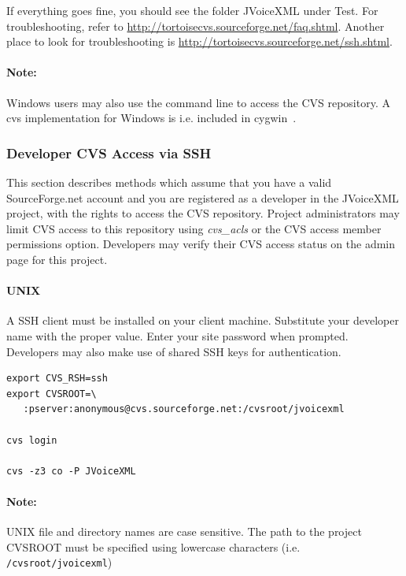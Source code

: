 \documentclass[11pt,a4paper]{article}
\begin{document}
If everything goes fine, you should see the folder JVoiceXML under Test. 
For troubleshooting, refer to 
\url{http://tortoisecvs.sourceforge.net/faq.shtml}. 
Another place to look for  troubleshooting is 
\url{http://tortoisecvs.sourceforge.net/ssh.shtml}.

\paragraph{Note:}
Windows users may also use the command line to access the CVS repository. 
A cvs implementation for Windows is i.e. included in cygwin~\cite{cygwin}.

\subsubsection{Developer CVS Access via SSH}
\label{sec:developer-cvs-access}

This section describes methods which assume that you have a valid 
SourceForge.net account and you 
are registered as a developer in the JVoiceXML project, with the rights
to access the CVS repository.
Project administrators may limit CVS access to this repository using 
\emph{cvs\_acls} or the CVS access member permissions option. 
Developers may verify their CVS access status on the admin page for this 
project.

\paragraph{UNIX}

A SSH client 
must be installed on your client machine. Substitute your
developer name with the proper value. Enter your site password when prompted.
Developers may also make use of shared SSH keys for authentication.

\begin{lstlisting}
export CVS_RSH=ssh
export CVSROOT=\
   :pserver:anonymous@cvs.sourceforge.net:/cvsroot/jvoicexml

cvs login
 
cvs -z3 co -P JVoiceXML
\end{lstlisting}

\paragraph{Note:} UNIX file and directory names are case sensitive. The 
path to the project CVSROOT must be specified using lowercase characters (i.e.
\texttt{/cvsroot/jvoicexml})
\end{document}
